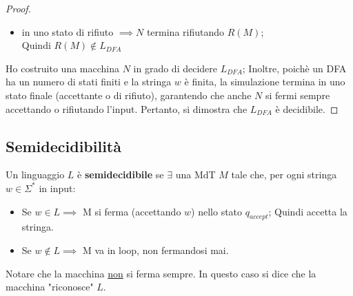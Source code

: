 \documentclass{article}  %
\theoremstyle{definition}
\begin{document}
\begin{esercizio}[Esercizio 1.1]
\begin{proof}
\begin{enumerate}
\begin{itemize}
				      \item in uno stato di rifiuto $\implies N$ termina rifiutando $R(M)$; \\ Quindi $R(M) \notin L_{DFA}$
			      \end{itemize}
		\end{enumerate}
		Ho costruito una macchina $N$ in grado di decidere $L_{DFA}$; Inoltre, poichè un DFA ha
		un numero di stati finiti e la stringa $w$ è finita, la simulazione termina in uno stato finale
		(accettante o di rifiuto), garantendo che anche $N$ si fermi sempre accettando o rifiutando l'input.
		Pertanto, si dimostra che $L_{DFA}$ è decidibile.
	\end{proof}
\end{esercizio}
\subsection{Semidecidibilità}
Un linguaggio $L$ è \textbf{semidecidibile} se $\exists$ una MdT $M$ tale che, per ogni stringa $w\in \Sigma^*$ in input:
\begin{itemize}
	\item Se $w \in L \implies$ M si ferma (accettando $w$) nello stato $q_{accept}$; Quindi accetta la stringa.
	\item Se $w \notin L \implies$ M va in loop, non fermandosi mai.
\end{itemize}
Notare che la macchina \underline{non} si ferma sempre. In questo caso si dice che la macchina "riconosce" $L$.
\end{document}

